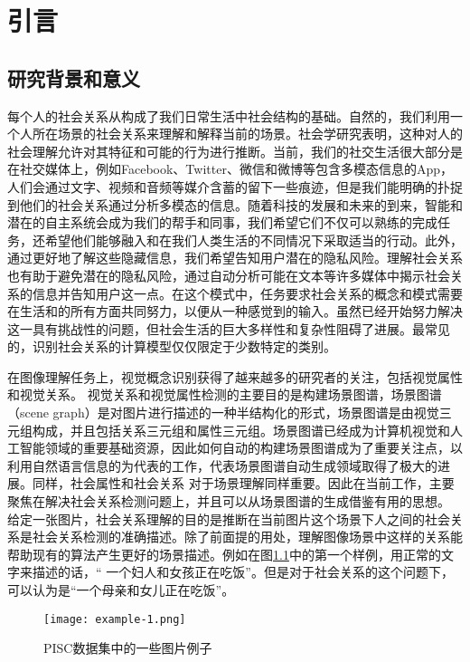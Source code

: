 

\chapter{引言}
\label{ch:intro}

\section{研究背景和意义}

每个人的社会关系从构成了我们日常生活中社会结构的基础。自然的，我们利用一个人所在场景的社会关系来理解和解释当前的场景。社会学研究表明，这种对人的社会理解允许对其特征和可能的行为进行推断。当前，我们的社交生活很大部分是在社交媒体上，例如Facebook、Twitter、微信和微博等包含多模态信息的App，人们会通过文字、视频和音频等媒介含蓄的留下一些痕迹，但是我们能明确的扑捉到他们的社会关系通过分析多模态的信息。随着科技的发展和未来的到来，智能和潜在的自主系统会成为我们的帮手和同事，我们希望它们不仅可以熟练的完成任务，还希望他们能够融入和在我们人类生活的不同情况下采取适当的行动。此外，通过更好地了解这些隐藏信息，我们希望告知用户潜在的隐私风险。理解社会关系也有助于避免潜在的隐私风险，通过自动分析可能在文本等许多媒体中揭示社会关系的信息并告知用户这一点。在这个模式中，任务要求社会关系的概念和模式需要在生活和的所有方面共同努力，以便从一种感觉到的输入。虽然已经开始努力解决这一具有挑战性的问题，但社会生活的巨大多样性和复杂性阻碍了进展。最常见的，识别社会关系的计算模型仅仅限定于少数特定的类别。

在图像理解任务上，视觉概念识别获得了越来越多的研究者的关注，包括视觉属性和视觉关系\cite{lu2016visual}。
视觉关系和视觉属性检测的主要目的是构建场景图谱，场景图谱（scene graph）\cite{johnson2015image}是对图片进行描述的一种半结构化的形式，场景图谱是由视觉三元组构成，并且包括关系三元组和属性三元组。场景图谱已经成为计算机视觉和人工智能领域的重要基础资源，因此如何自动的构建场景图谱成为了重要关注点，以利用自然语言信息的\cite{lu2016visual}为代表的工作，代表场景图谱自动生成领域取得了极大的进展。同样，社会属性和社会关系\cite{wang2010seeing} 对于场景理解同样重要。因此在当前工作，主要聚焦在解决社会关系检测问题上，并且可以从场景图谱的生成借鉴有用的思想。
给定一张图片，社会关系理解的目的是推断在当前图片这个场景下人之间的社会关系是社会关系检测的准确描述。除了前面提的用处，理解图像场景中这样的关系能帮助现有的算法产生更好的场景描述。例如在图\ref{fig:intro-example}中的第一个样例，用正常的文字来描述的话，`` 一个妇人和女孩正在吃饭''。但是对于社会关系的这个问题下，可以认为是``一个母亲和女儿正在吃饭''。
\begin{figure}[htpb]
	\centering
	\texttt{[image: example-1.png]}
    \caption{PISC数据集中的一些图片例子}
	\vspace*{-3.5mm}
	\label{fig:intro-example}
\end{figure}

